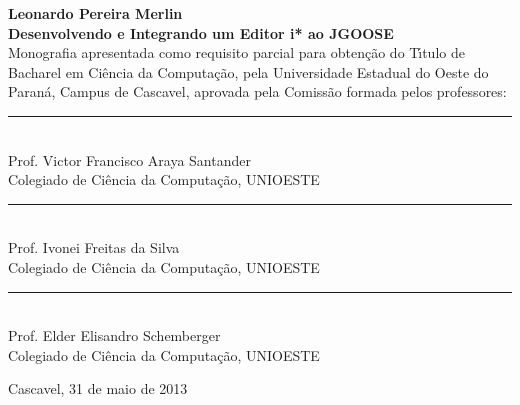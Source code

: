 
\begin{center}
\fontsize{12}{12}
\textbf{Leonardo Pereira Merlin}\\
\vspace{3cm}
\fontsize{14}{14}
\textbf{Desenvolvendo e Integrando um Editor i* ao JGOOSE}\\
\vspace{3cm}
\fontsize{10}{10}
Monografia apresentada como requisito parcial para obten\c{c}\~{a}o do T\'{\i}tulo de Bacharel em Ci\^{e}ncia da Computa\c{c}\~{a}o, pela Universidade Estadual do Oeste do Paran\'{a}, Campus de Cascavel, aprovada pela Comiss\~{a}o formada pelos professores:\\
\vspace{2cm}
\begin{flushright}
\begin{minipage}[10cm] {8.5cm}
\begin{center}
\rule{6cm}{0.01mm}\\
Prof. Victor Francisco Araya Santander\\
Colegiado de Ci\^{e}ncia da Computa\c{c}\~{a}o, UNIOESTE\\
\vspace{1cm}
\rule{6cm}{0.01mm}\\
Prof. Ivonei Freitas da Silva\\
Colegiado de Ci\^{e}ncia da Computa\c{c}\~{a}o, UNIOESTE\\
\vspace{1cm}
\rule{6cm}{0.01mm}\\
Prof. Elder Elisandro Schemberger\\
Colegiado de Ci\^{e}ncia da Computa\c{c}\~{a}o, UNIOESTE\\
\end{center}
\end{minipage}
\end{flushright}
\vspace{3.5cm}
Cascavel, 31 de maio de 2013
\end{center} 
